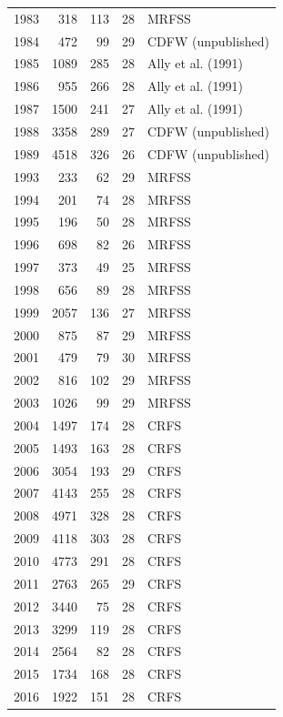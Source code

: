 \documentclass[12pt,]{article}
\begin{document}
\begin{table}[ht]
\begin{tabular}{rrrrl}
  1983 & 318 & 113 & 28 & MRFSS \\ 
  1984 & 472 & 99 & 29 & CDFW (unpublished) \\ 
  1985 & 1089 & 285 & 28 & Ally et al. (1991) \\ 
  1986 & 955 & 266 & 28 & Ally et al. (1991) \\ 
  1987 & 1500 & 241 & 27 & Ally et al. (1991) \\ 
  1988 & 3358 & 289 & 27 & CDFW (unpublished) \\ 
  1989 & 4518 & 326 & 26 & CDFW (unpublished) \\ 
  1993 & 233 & 62 & 29 & MRFSS \\ 
  1994 & 201 & 74 & 28 & MRFSS \\ 
  1995 & 196 & 50 & 28 & MRFSS \\ 
  1996 & 698 & 82 & 26 & MRFSS \\ 
  1997 & 373 & 49 & 25 & MRFSS \\ 
  1998 & 656 & 89 & 28 & MRFSS \\ 
  1999 & 2057 & 136 & 27 & MRFSS \\ 
  2000 & 875 & 87 & 29 & MRFSS \\ 
  2001 & 479 & 79 & 30 & MRFSS \\ 
  2002 & 816 & 102 & 29 & MRFSS \\ 
  2003 & 1026 & 99 & 29 & MRFSS \\ 
  2004 & 1497 & 174 & 28 & CRFS \\ 
  2005 & 1493 & 163 & 28 & CRFS \\ 
  2006 & 3054 & 193 & 29 & CRFS \\ 
  2007 & 4143 & 255 & 28 & CRFS \\ 
  2008 & 4971 & 328 & 28 & CRFS \\ 
  2009 & 4118 & 303 & 28 & CRFS \\ 
  2010 & 4773 & 291 & 28 & CRFS \\ 
  2011 & 2763 & 265 & 29 & CRFS \\ 
  2012 & 3440 & 75 & 28 & CRFS \\ 
  2013 & 3299 & 119 & 28 & CRFS \\ 
  2014 & 2564 & 82 & 28 & CRFS \\ 
  2015 & 1734 & 168 & 28 & CRFS \\ 
  2016 & 1922 & 151 & 28 & CRFS \\ 
   \hline
\end{tabular}
\end{table}

\FloatBarrier
\end{document}
